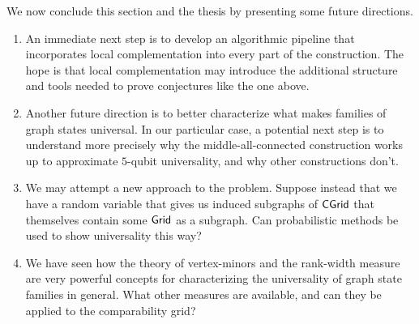 We now conclude this section and the thesis by presenting some future directions.
\begin{enumerate}
    \item An immediate next step is to develop an algorithmic pipeline that incorporates local complementation into every part of the construction. The hope is that local complementation may introduce the additional structure and tools needed to prove conjectures like the one above.
    \item Another future direction is to better characterize what makes families of graph states universal. In our particular case, a potential next step is to understand more precisely why the middle-all-connected construction works up to approximate $5$-qubit universality, and why other constructions don't.
    \item We may attempt a new approach to the problem. Suppose instead that we have a random variable that gives us induced subgraphs of $\mathsf{CGrid}$ that themselves contain some $\mathsf{Grid}$ as a subgraph. Can probabilistic methods be used to show universality this way?
    \item We have seen how the theory of vertex-minors and the rank-width measure are very powerful concepts for characterizing the universality of graph state families in general. What other measures are available, and can they be applied to the comparability grid?
\end{enumerate}